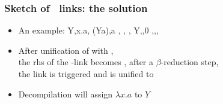\documentclass{pres}
\begin{document}
\begin{frame}[fragile]
  \frametitle{Sketch of \maybelam\ links: the solution}

  \def\var{Y}

  \begin{itemize}
    \item An example: 
      \printAlll
      {{{\var,\lambda x.a},
        {(\var\appsep a),a}}}
      {{{, },
        {,}}}
      {{{\var,,0}}}
      {{{\llambda,,,}}}
    \item After unification of  with , \\
        the rhs of the \llambda-link becomes , after a $\beta$-reduction step,\\
        the link is triggered and  is unified to 
    \item Decompilation will assign $\lambda x.a$ to $\var$
  \end{itemize}

\end{frame}


  

\end{document}
